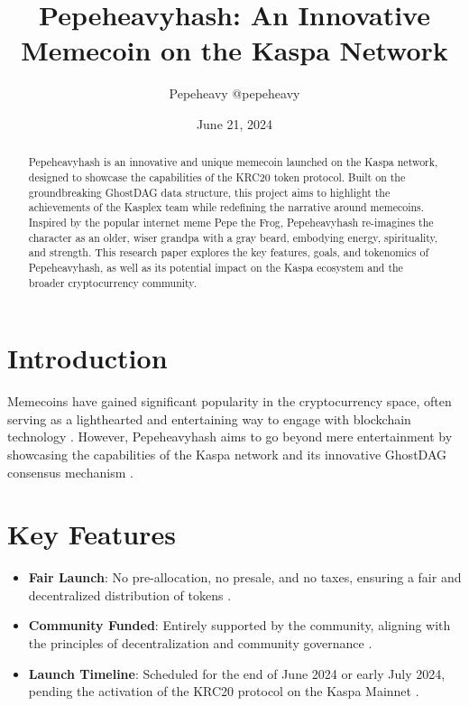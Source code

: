 \documentclass{article}
\title{\textbf{Pepeheavyhash: An Innovative Memecoin on the Kaspa Network}}
\author{Pepeheavy @pepeheavy}
\date{June 21, 2024}
\begin{document}
\maketitle

\begin{abstract}
Pepeheavyhash is an innovative and unique memecoin launched on the Kaspa network, designed to showcase the capabilities of the KRC20 token protocol. Built on the groundbreaking GhostDAG data structure, this project aims to highlight the achievements of the Kasplex team while redefining the narrative around memecoins. Inspired by the popular internet meme Pepe the Frog, Pepeheavyhash re-imagines the character as an older, wiser grandpa with a gray beard, embodying energy, spirituality, and strength. This research paper explores the key features, goals, and tokenomics of Pepeheavyhash, as well as its potential impact on the Kaspa ecosystem and the broader cryptocurrency community.
\end{abstract}

\section{Introduction}
Memecoins have gained significant popularity in the cryptocurrency space, often serving as a lighthearted and entertaining way to engage with blockchain technology \citep{chohan2021rise}. However, Pepeheavyhash aims to go beyond mere entertainment by showcasing the capabilities of the Kaspa network and its innovative GhostDAG consensus mechanism \citep{sompolinsky2020phantom}.

\section{Key Features}
\begin{itemize}
    \item \textbf{Fair Launch}: No pre-allocation, no presale, and no taxes, ensuring a fair and decentralized distribution of tokens \citep{fairlaunch2023}.
    \item \textbf{Community Funded}: Entirely supported by the community, aligning with the principles of decentralization and community governance \citep{defi2022}.
    \item \textbf{Launch Timeline}: Scheduled for the end of June 2024 or early July 2024, pending the activation of the KRC20 protocol on the Kaspa Mainnet \citep{kaspadev2024}.
\end{itemize}
\end{document}

